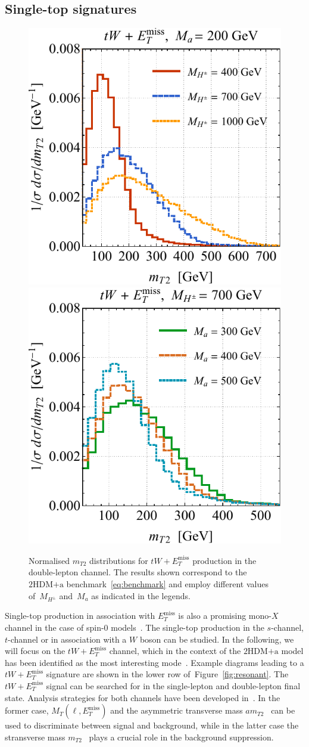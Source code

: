 \documentclass[a4paper, 11pt,notoc]{article}
\newcommand{\MET}{\ensuremath{E_T^\mathrm{miss}}\xspace}
\newcommand{\ma}{\ensuremath{M_{a}}\xspace}
\newcommand{\mHc}{\ensuremath{M_{H^{\pm}}}\xspace}
\newcommand{\hdma}{\ensuremath{\textrm{2HDM+a}}\xspace}
\begin{document}
\subsection{Single-top signatures}

\begin{figure}[t!]
\centering
\includegraphics[height=0.45\textwidth]{mt2l.pdf} \qquad 
\includegraphics[height=0.45\textwidth]{mt2r.pdf}
\vspace{2mm}
\caption{\label{fig:mt2spectra} Normalised $m_{T2}$ distributions for $tW+\MET$ production in the double-lepton channel.  The  results shown correspond to the \hdma benchmark~\eqref{eq:benchmark} and employ different values of~$\mHc$ and~$\ma$ as indicated in the legends.}
\end{figure}

Single-top production in association with $\MET$ is also a promising mono-$X$ channel in the case of spin-0 models~\cite{Pinna:2017tay,Pani:2017qyd,Plehn:2017bys}. The single-top production in the $s$-channel, $t$-channel  or  in association with a $W$ boson can be studied. In the following, we will focus on the $tW + \MET$ channel, which in the context of the \hdma model has been identified as the most interesting mode~\cite{Pani:2017qyd}. Example diagrams leading to a $tW + \MET$ signature are shown in the lower row of~Figure~\ref{fig:resonant}. The $tW + \MET$ signal can be searched for in the single-lepton and double-lepton final state. Analysis strategies for both channels have been developed in~\cite{Pani:2017qyd}. In the former case, $M_T (\ell, \MET)$ and the asymmetric transverse mass $am_{T2}$~\cite{Konar:2009qr,Lester:2014yga} can be used to discriminate between signal and background, while in the latter case the stransverse mass $m_{T2}$~\cite{Lester:1999tx,Barr:2003rg} plays a crucial role in the background suppression.
\end{document}
